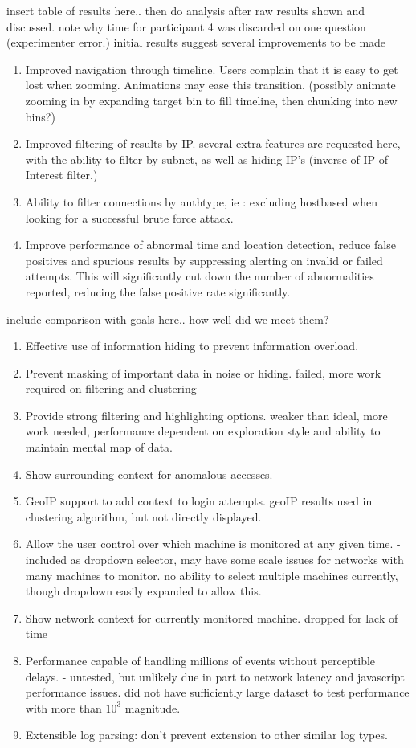 insert table of results here.. then do analysis after raw results shown and discussed.
note why time for participant 4 was discarded on one question (experimenter error.)
initial results suggest several improvements to be made
\begin{enumerate}
\item{Improved navigation through timeline. Users complain that it is easy to get lost when zooming. Animations may ease this transition. (possibly animate zooming in by expanding target bin to fill timeline, then chunking into new bins?)}
\item{Improved filtering of results by IP. several extra features are requested here, with the ability to filter by subnet, as well as hiding IP's (inverse of IP of Interest filter.)}
\item{Ability to filter connections by authtype, ie : excluding hostbased when looking for a successful brute force attack.}
\item{Improve performance of abnormal time and location detection, reduce false positives and spurious results by suppressing alerting on invalid or failed attempts. This will significantly cut down the number of abnormalities reported, reducing the false positive rate significantly.}
\end{enumerate}

include comparison with goals here.. how well did we meet them?
\begin{enumerate}
\item{Effective use of information hiding to prevent information overload.}
\item{Prevent masking of important data in noise or hiding. failed, more work required on filtering and clustering}
\item{Provide strong filtering and highlighting options. weaker than ideal, more work needed, performance dependent on exploration style and ability to maintain mental map of data.}
\item{Show surrounding context for anomalous accesses.}
\item{GeoIP support to add context to login attempts. geoIP results used in clustering algorithm, but not directly displayed.}
\item{Allow the user control over which machine is monitored at any given time. -included as dropdown selector, may have some scale issues for networks with many machines to monitor. no ability to select multiple machines currently, though dropdown easily expanded to allow this.}
\item{Show network context for currently monitored machine. dropped for lack of time}
\item{Performance capable of handling millions of events without perceptible delays. - untested, but unlikely due in part to network latency and javascript performance issues. did not have sufficiently large dataset to test performance with more than $10^3$ magnitude.}
\item{Extensible log parsing: don't prevent extension to other similar log types.}
\end{enumerate}

